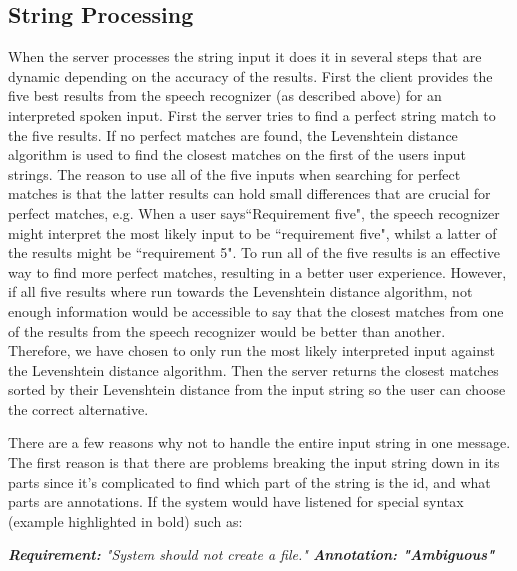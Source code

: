 \documentclass[conference]{IEEEtran}
\begin{document}
\subsection{String Processing}
When the server processes the string input it does it in several steps that are dynamic depending on the accuracy of the results. 
First the client provides the five best results from the speech recognizer (as described above) for an interpreted spoken input. 
First the server tries to find a perfect string match to the five results.
If no perfect matches are found, the Levenshtein distance algorithm is used to find the closest matches on the first of the users input strings. The reason to use all of the five inputs when searching for perfect matches is that the latter results can hold small differences that are crucial for perfect matches, e.g. When a user says``Requirement five", the speech recognizer might interpret the most likely input to be ``requirement five", whilst a latter of the results might  be ``requirement 5". To run all of the five results is an effective way to find more perfect matches, resulting in a better user experience. However, if all five results where run towards the Levenshtein distance algorithm, not enough information would be accessible to say that the closest matches from one of the results from the speech recognizer would be better than another. Therefore, we have chosen to only run the most likely interpreted input against the Levenshtein distance algorithm.
Then the server returns the closest matches sorted by their Levenshtein distance from the input string so the user can choose the correct alternative.

There are a few reasons why not to handle the entire input string in one message. 
The first reason is that there are problems breaking the input string down in its parts since it's complicated to find which part of the string is the id, and what parts are annotations. 
If the system would have listened for special syntax (example highlighted in bold) such as:
\begin{framed}
\begin{flushleft}
\emph{\textbf{Requirement:} "System should not create a file." \textbf{Annotation: "Ambiguous"}}
\end{flushleft}
\end{framed}
\end{document}

